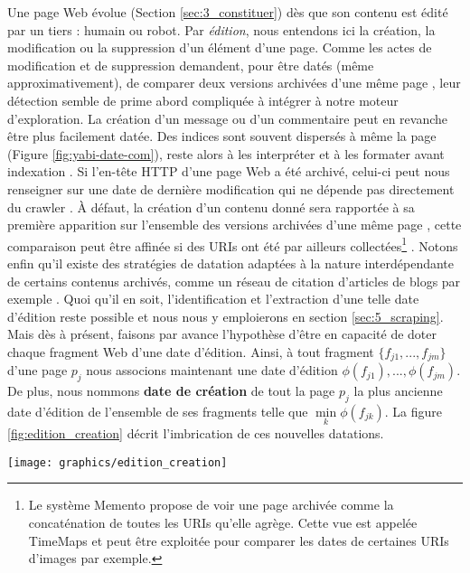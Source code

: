 \documentclass[symmetric,justified,marginals=raggedouter]{tufte-book}
\begin{document}
Une page Web évolue (Section \ref{sec:3_constituer}) dès que son contenu est édité par un tiers : humain ou robot. Par \textit{édition}, nous entendons ici la création, la modification ou la suppression d'un élément d'une page. Comme les actes de modification et de suppression demandent, pour être datés (même approximativement), de comparer deux versions archivées d'une même page \citep{rocco_page_2003, nunes_using_2007}, leur détection semble de prime abord compliquée à intégrer à notre moteur d'exploration. La création d'un message ou d'un commentaire peut en revanche être plus facilement datée. Des indices sont souvent dispersés à même la page (Figure \ref{fig:yabi-date-com}), reste alors à les interpréter et à les formater avant indexation \citep{de_jong_temporal_2005,kanhabua_using_2009}. Si l'en-tête HTTP d'une page Web a été archivé, celui-ci peut nous renseigner sur une date de dernière modification qui ne dépende pas directement du crawler  \citep{amitay_trend_2004}. À défaut, la création d'un contenu donné sera rapportée à sa première apparition sur l'ensemble des versions archivées d'une même page \citep{jatowt_detecting_2007}, cette comparaison peut être affinée si des URIs ont été par ailleurs collectées\footnote{Le système Memento propose de voir une page archivée comme la concaténation de toutes les URIs qu'elle agrège. Cette vue est appelée TimeMaps  \citep{van_de_sompel_http_2013} et peut être exploitée pour comparer les dates de certaines URIs d'images par exemple.} \citep{aturban_difficulties_2017}. Notons enfin qu'il existe des stratégies de datation adaptées à la nature interdépendante de certains contenus archivés, comme un réseau de citation d'articles de blogs par exemple \citep{toyoda_whats_2006,spitz_predicting_2018}. Quoi qu'il en soit, l'identification et l'extraction d'une telle date d'édition reste possible et nous nous y emploierons en section \ref{sec:5_scraping}. \\

\noindent Mais dès à présent, faisons par avance l'hypothèse d'être en capacité de doter chaque fragment Web d'une date d'édition. Ainsi, à tout fragment $\{f_{j1},...,f_{jm}\}$ d'une page $p_j$ nous associons maintenant une date d'édition $\phi(f_{j1}),...,\phi(f_{jm})$. De plus, nous nommons \textbf{date de création} de tout la page $p_j$ la plus ancienne date d'édition de l'ensemble de ses fragments telle que $\min\limits_{k} \phi(f_{jk})$. La figure \ref{fig:edition_creation} décrit l'imbrication de ces nouvelles datations. 

\begin{figure*}
  \centering
  \texttt{[image: graphics/edition\_creation]}
  \caption{Dates d'édition des fragments Web $\{f_{11}, f_{12}\}$ et date de création de la page $p_1$}
  \label{fig:edition_creation}
\end{figure*} 
\end{document}
